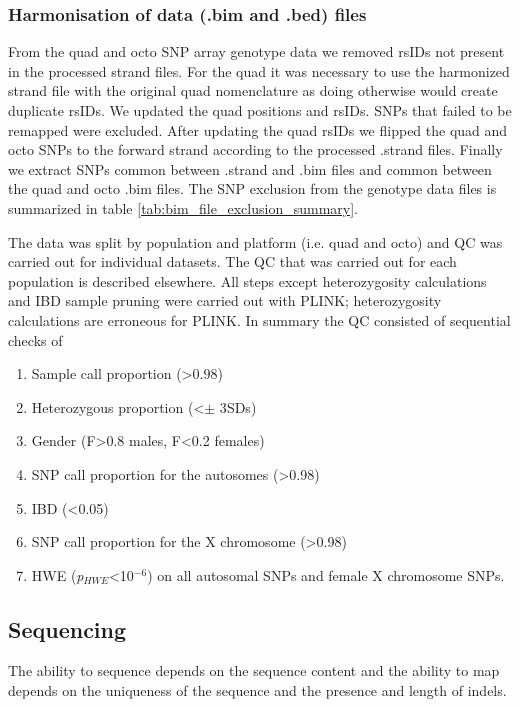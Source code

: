 \subsubsection{Harmonisation of data (.bim and .bed) files}
From the quad and octo \gls{SNP} array genotype data we removed rsIDs not present in the processed strand files. For the quad it was necessary to use the harmonized strand file with the original quad nomenclature as doing otherwise would create duplicate rsIDs. We updated the quad positions and rsIDs. SNPs that failed to be remapped were excluded. After updating the quad rsIDs we flipped the quad and octo \glspl{SNP} to the forward strand according to the processed .strand files. Finally we extract \glspl{SNP} common between .strand and .bim files and common between the quad and octo .bim files. The SNP exclusion from the genotype data files is summarized in table \ref{tab:bim_file_exclusion_summary}.


The data was split by population and platform (i.e. quad and octo) and \gls{QC} was carried out for individual datasets. The \gls{QC} that was carried out for each population is described elsewhere.\cite{Gurdasani2015} All steps except heterozygosity calculations and IBD sample pruning were carried out with PLINK; heterozygosity calculations are erroneous for PLINK. In summary the QC consisted of sequential checks of
\begin{enumerate}
\item Sample call proportion (>0.98)
\item Heterozygous proportion (\textless $\pm$ 3\glspl{SD})
\item Gender (F>0.8 males, F<0.2 females)
\item SNP call proportion for the autosomes (\textgreater0.98)
\item IBD (<0.05)
\item SNP call proportion for the X chromosome (\textgreater0.98)
\item \gls{HWE} (\textit{p}$_{HWE}$<10$^{-6}$) on all autosomal SNPs and female X chromosome SNPs.
\end{enumerate}

\subsection{Sequencing}
The ability to sequence depends on the sequence content and the ability to map depends on the uniqueness of the sequence and the presence and length of indels.
